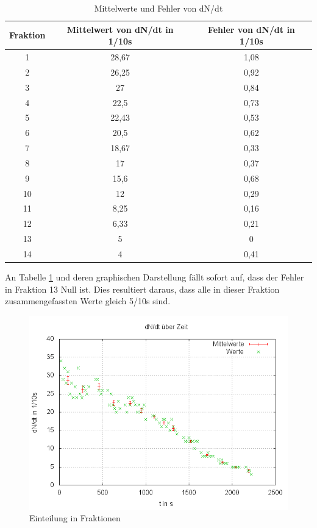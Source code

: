 \begin{table}
\centering
\begin{tabular}{ccc}

Fraktion	&Mittelwert von dN/dt in 1/10s	&Fehler von dN/dt in 1/10s \\
\toprule
1		&28,67				&1,08\\

2		&26,25				&0,92\\

3		&27					&0,84\\

4		&22,5				&0,73\\

5		&22,43				&0,53\\

6		&20,5				&0,62\\

7		&18,67				&0,33\\

8		&17					&0,37\\

9		&15,6				&0,68\\

10		&12					&0,29\\

11		&8,25				&0,16\\

12		&6,33				&0,21\\

13		&5					&0\\

14		&4					&0,41\\

\end{tabular}
\caption{Mittelwerte und Fehler von dN/dt}
\label{tbl_3}
\end{table}


An Tabelle \ref{tbl_3} und deren graphischen Darstellung  fällt sofort auf, dass 
der Fehler in Fraktion 13 Null ist. Dies resultiert daraus, dass alle in dieser Fraktion zusammengefassten Werte 
gleich 5/10s sind. 


\begin{figure}
\centering
        \includegraphics[width=.8\textwidth]{images/dNdt(t)MWmitaltenWerten.png}
\caption{Einteilung in Fraktionen}
\label{dNdt(t)MWmitaltenWerten}
\end{figure}


